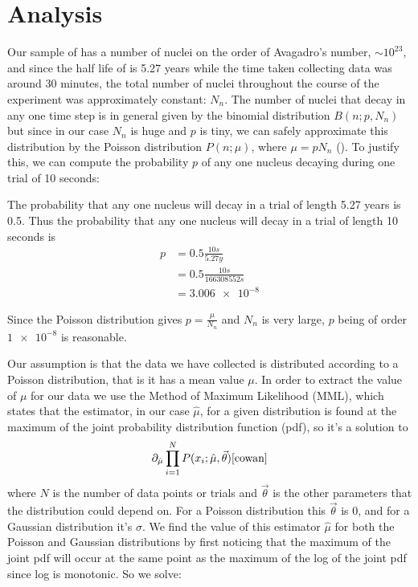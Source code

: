 \documentclass[12pt]{article}
\numberwithin{equation}{section}
\numberwithin{figure}{section}
\numberwithin{table}{section}
\begin{document}
\section{Analysis}\label{sec:Analysis}
\par Our sample of  has a number of nuclei on the order of Avagadro's number, $\sim 10^{23}$, and since the half life of  is 5.27 years \cite{manual} while the time taken collecting data was around 30 minutes, the total number of nuclei throughout the course of the experiment was approximately constant: $N_n$. The number of nuclei that decay in any one time step is in general given by the binomial distribution $B(n;p,N_n)$ but since in our case $N_n$ is huge and $p$ is tiny, we can safely approximate this distribution by the Poisson distribution $P(n;\mu)$, where $\mu=pN_n$ (). To justify this, we can compute the probability $p$ of any one nucleus decaying during one trial of 10 seconds:
\par The probability that any one nucleus will decay in a trial of length 5.27 years is 0.5. Thus the probability that any one nucleus will decay in a trial of length 10 seconds is
\begin{align*}
    p&=0.5\frac{10s}{5.27y}\\
    &=0.5\frac{10s}{166308552s}\\
    &=\num{3.006e-8}
\end{align*}
\par Since the Poisson distribution gives $p=\frac{\mu}{N_n}$ and $N_n$ is very large, $p$ being of order $\num{1e-8}$ is reasonable. 
\par Our assumption is that the data we have collected is distributed according to a Poisson distribution, that is it has a mean value $\mu$. In order to extract the value of $\mu$ for our data we use the Method of Maximum Likelihood (MML), which states that the estimator, in our case $\hat\mu$, for a given distribution is found at the maximum of the joint probability distribution function (pdf), so it's a solution to 
\begin{equation}
    \partial_{\hat\mu}\prod_{i=1}^N P(x_i;\hat\mu,\vec{\theta})\cite{cowan}
    \label{eqn:Joint PDF}
\end{equation}
where $N$ is the number of data points or trials and $\vec{\theta}$ is the other parameters that the distribution could depend on. For a Poisson distribution this $\vec{\theta}$ is 0, and for a Gaussian distribution it's $\sigma$. We find the value of this estimator $\hat\mu$ for both the Poisson and Gaussian distributions by first noticing that the maximum of the joint pdf will occur at the same point as the maximum of the log of the joint pdf since log is monotonic. So we solve:
\end{document}
